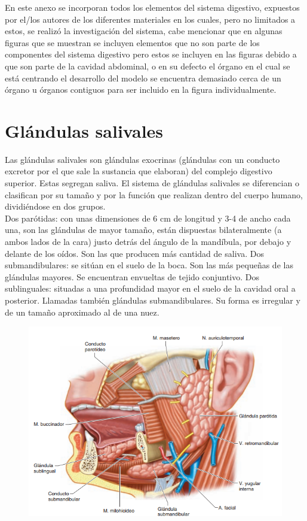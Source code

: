 \appendix  
\addappheadtotoc 
\appendixpage 

En este anexo se incorporan todos los elementos del sistema digestivo, expuestos por el/los autores de los diferentes materiales en los cuales, 
pero no limitados a estos, se realizó la investigación del sistema, cabe mencionar que en algunas figuras que se muestran se incluyen elementos 
que no son parte de los componentes del sistema digestivo pero estos se incluyen en las figuras debido a que son parte de la cavidad abdominal, 
o en su defecto el órgano en el cual se está centrando el desarrollo del modelo se encuentra demasiado cerca de un órgano u órganos contiguos 
para ser incluido en la figura individualmente.\\

\section{Glándulas salivales}
Las glándulas salivales son glándulas exocrinas (glándulas con un conducto excretor por el que sale la sustancia que elaboran) del complejo digestivo 
superior. Estas segregan saliva. El sistema de  glándulas salivales se diferencian o clasifican por  su tamaño y por la función que realizan dentro 
del cuerpo humano, dividiéndose en dos grupos.\\ [ 40 ]
Dos parótidas: con unas dimensiones de 6 cm de longitud y 3-4 de ancho cada una, son las glándulas de mayor tamaño, están dispuestas bilateralmente 
(a ambos lados de la cara) justo detrás del ángulo de la mandíbula, por debajo y delante de los oídos. Son las que producen más cantidad de saliva.
Dos submandibulares: se sitúan en el suelo de la boca. Son las más pequeñas de las glándulas mayores. Se encuentran envueltas de tejido conjuntivo.
Dos sublinguales: situadas a una profundidad mayor en el suelo de la cavidad oral a posterior. Llamadas también glándulas submandibulares. Su forma 
es irregular y de un tamaño aproximado al de una nuez.\\
\begin{figure}[H]
	\begin{center}
 		\includegraphics[width = 1\textwidth]{v2/images/image34.png}
	\end{center} 
\end{figure}


